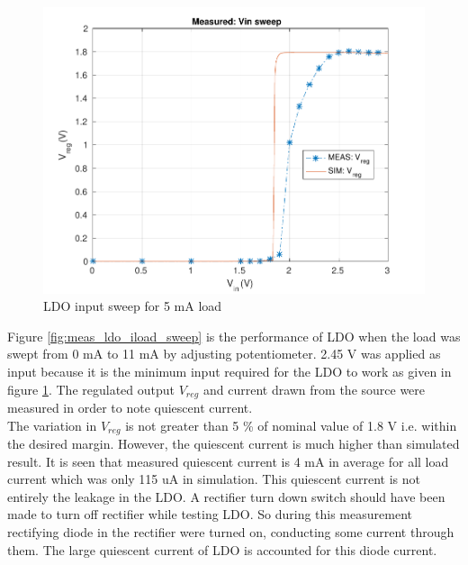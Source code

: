 \documentclass[12pt,a4paper,UKenglish]{report}
\begin{document}
\begin{figure} [!htbp]
  \centering
  \includegraphics[width=\textwidth]{img/meas/ldo_vin_sweep.pdf} 
 \caption{LDO input sweep for 5 mA load} 
\label{fig:meas_ldo_vin_sweep} 
\end{figure}

Figure \ref{fig:meas_ldo_iload_sweep} is the performance of LDO when the load was swept from 0 mA to 11 mA by adjusting 
potentiometer. 2.45 V was applied as input because it is the minimum input required for the LDO to work as given in 
figure \ref{fig:meas_ldo_vin_sweep}. The regulated output $V_{reg}$ and current drawn from the source were measured in 
order to note quiescent current. \\

The variation in $V_{reg}$ is not greater than 5 \% of nominal value of 1.8 V i.e. within the desired margin. However, the quiescent current is much 
higher than simulated result. It is seen that measured quiescent current is 4 mA in average for all load current which was 
only 115 uA in simulation. This quiescent current is not entirely the leakage in the LDO. A rectifier turn down switch should have been made to turn off rectifier while testing LDO.  So during this measurement rectifying diode in the rectifier were turned on, conducting some current through them. The large quiescent current of LDO is accounted for this diode current.\\

\end{document}
